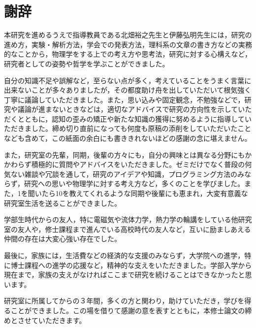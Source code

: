 \documentclass[autodetect-engine,dvi=dvipdfmx,a4paper,ja=standard,oneside,openany,11pt,draft]{bxjsbook}
\begin{document}
\chapter*{謝辞}
本研究を進めるうえで指導教員である北畑裕之先生と伊藤弘明先生には，研究の進め方，実験・解析方法，学会での発表方法，理科系の文章の書き方などの実務的なことから，物理学をする上での考え方や思考法，研究に対する心構えなど，研究者としての姿勢や哲学を学ぶことができました。

自分の知識不足や誤解など，至らない点が多く，考えていることをうまく言葉に出来ないことが多々ありましたが，その都度助け舟を出していただいて根気強く丁寧に議論していただきました。また，思い込みや固定観念，不勉強などで，研究や議論が進まないときなどは，適切なアドバイスで研究の方向性を示していただくとともに，認知の歪みの矯正や新たな知識の獲得に努めるように指導していただきました。締め切り直前になっても何度も原稿の添削をしていただいたことなども含めて，この紙面の余白にも書ききれないほどの感謝の念に堪えません。

また，研究室の先輩，同期，後輩の方々にも，自分の興味とは異なる分野にもかかわらず積極的に質問やアドバイスをいただきました。ゼミだけでなく普段の何気ない雑談や冗談を通して，研究のアイデアや知識，プログラミング方法のみならず，研究への思いや物理学に対する考え方など，多くのことを学びました。また，1を聞いたら10を教えてくれるような同期や後輩にも恵まれ，大変有意義な研究室生活を送ることができました。

学部生時代からの友人，特に電磁気や流体力学，熱力学の輪講をしている他研究室の友人や，修士課程まで進んでいる高校時代の友人など，互いに励ましあえる仲間の存在は大変心強い存在でした。

最後に，家族には，生活費などの経済的な支援のみならず，大学院への進学，特に博士課程への進学の応援など，精神的な支えをいただきました。学部入学から現在まで，家族の支えがなければここまで研究を続けることはできなかったと思います。

研究室に所属してからの３年間，多くの方と関わり，助けていただき，学びを得ることができました。この場を借りて感謝の意を表すとともに，本修士論文の締めとさせていただきます。


\ifdraft{
  
  
}{}
\end{document}
